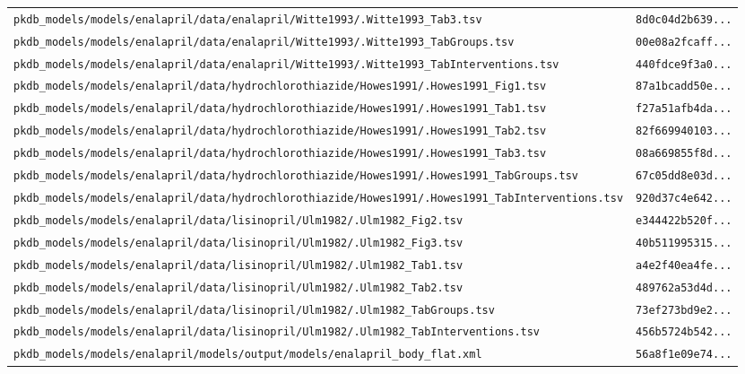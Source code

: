 \documentclass{article}
\begin{document}
\begin{longtable}{ll}
\texttt{pkdb\_models/models/enalapril/data/enalapril/Witte1993/.Witte1993\_Tab3.tsv} & \texttt{8d0c04d2b639...} \\
\texttt{pkdb\_models/models/enalapril/data/enalapril/Witte1993/.Witte1993\_TabGroups.tsv} & \texttt{00e08a2fcaff...} \\
\texttt{pkdb\_models/models/enalapril/data/enalapril/Witte1993/.Witte1993\_TabInterventions.tsv} & \texttt{440fdce9f3a0...} \\
\texttt{pkdb\_models/models/enalapril/data/hydrochlorothiazide/Howes1991/.Howes1991\_Fig1.tsv} & \texttt{87a1bcadd50e...} \\
\texttt{pkdb\_models/models/enalapril/data/hydrochlorothiazide/Howes1991/.Howes1991\_Tab1.tsv} & \texttt{f27a51afb4da...} \\
\texttt{pkdb\_models/models/enalapril/data/hydrochlorothiazide/Howes1991/.Howes1991\_Tab2.tsv} & \texttt{82f669940103...} \\
\texttt{pkdb\_models/models/enalapril/data/hydrochlorothiazide/Howes1991/.Howes1991\_Tab3.tsv} & \texttt{08a669855f8d...} \\
\texttt{pkdb\_models/models/enalapril/data/hydrochlorothiazide/Howes1991/.Howes1991\_TabGroups.tsv} & \texttt{67c05dd8e03d...} \\
\texttt{pkdb\_models/models/enalapril/data/hydrochlorothiazide/Howes1991/.Howes1991\_TabInterventions.tsv} & \texttt{920d37c4e642...} \\
\texttt{pkdb\_models/models/enalapril/data/lisinopril/Ulm1982/.Ulm1982\_Fig2.tsv} & \texttt{e344422b520f...} \\
\texttt{pkdb\_models/models/enalapril/data/lisinopril/Ulm1982/.Ulm1982\_Fig3.tsv} & \texttt{40b511995315...} \\
\texttt{pkdb\_models/models/enalapril/data/lisinopril/Ulm1982/.Ulm1982\_Tab1.tsv} & \texttt{a4e2f40ea4fe...} \\
\texttt{pkdb\_models/models/enalapril/data/lisinopril/Ulm1982/.Ulm1982\_Tab2.tsv} & \texttt{489762a53d4d...} \\
\texttt{pkdb\_models/models/enalapril/data/lisinopril/Ulm1982/.Ulm1982\_TabGroups.tsv} & \texttt{73ef273bd9e2...} \\
\texttt{pkdb\_models/models/enalapril/data/lisinopril/Ulm1982/.Ulm1982\_TabInterventions.tsv} & \texttt{456b5724b542...} \\
\texttt{pkdb\_models/models/enalapril/models/output/models/enalapril\_body\_flat.xml} & \texttt{56a8f1e09e74...} \\
\end{longtable}
\end{document}
